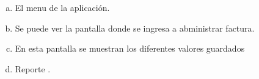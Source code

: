\documentclass[a4paper,11pt]{article}
\begin{document}
\begin{figure}[ht!]
    \hspace{0.1\linewidth}
\end{figure}



\begin{enumerate}[a)]
       \item El menu de la aplicación.
    \item Se puede ver la pantalla donde se ingresa a abministrar factura.
       \item  En esta pantalla se muestran los diferentes valores guardados 
     \item Reporte .   
\end{enumerate}
\end{document}
